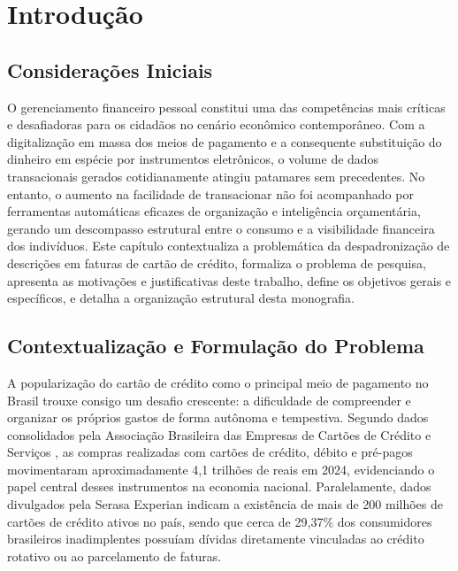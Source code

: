 \documentclass[
	12pt,				
	openright,			
	oneside,			
	a4paper,			
	english,			
	brazil				
	]{abntex2}
\begin{document}
\tableofcontents*
\cleardoublepage

\textual

\chapter{Introdução}
\label{chp:introducao}

\section{Considerações Iniciais}
\label{sec:intro_consideracoes_iniciais}

O gerenciamento financeiro pessoal constitui uma das competências mais críticas e desafiadoras para os cidadãos no cenário econômico contemporâneo. Com a digitalização em massa dos meios de pagamento e a consequente substituição do dinheiro em espécie por instrumentos eletrônicos, o volume de dados transacionais gerados cotidianamente atingiu patamares sem precedentes. No entanto, o aumento na facilidade de transacionar não foi acompanhado por ferramentas automáticas eficazes de organização e inteligência orçamentária, gerando um descompasso estrutural entre o consumo e a visibilidade financeira dos indivíduos. Este capítulo contextualiza a problemática da despadronização de descrições em faturas de cartão de crédito, formaliza o problema de pesquisa, apresenta as motivações e justificativas deste trabalho, define os objetivos gerais e específicos, e detalha a organização estrutural desta monografia.

\section{Contextualização e Formulação do Problema}
\label{sec:intro_contextualizacao}

A popularização do cartão de crédito como o principal meio de pagamento no Brasil trouxe consigo um desafio crescente: a dificuldade de compreender e organizar os próprios gastos de forma autônoma e tempestiva. Segundo dados consolidados pela Associação Brasileira das Empresas de Cartões de Crédito e Serviços \cite{abecs2024panorama}, as compras realizadas com cartões de crédito, débito e pré-pagos movimentaram aproximadamente 4,1 trilhões de reais em 2024, evidenciando o papel central desses instrumentos na economia nacional. Paralelamente, dados divulgados pela Serasa Experian \cite{serasa2024inadimplencia} indicam a existência de mais de 200 milhões de cartões de crédito ativos no país, sendo que cerca de 29,37\% dos consumidores brasileiros inadimplentes possuíam dívidas diretamente vinculadas ao crédito rotativo ou ao parcelamento de faturas.
\end{document}

